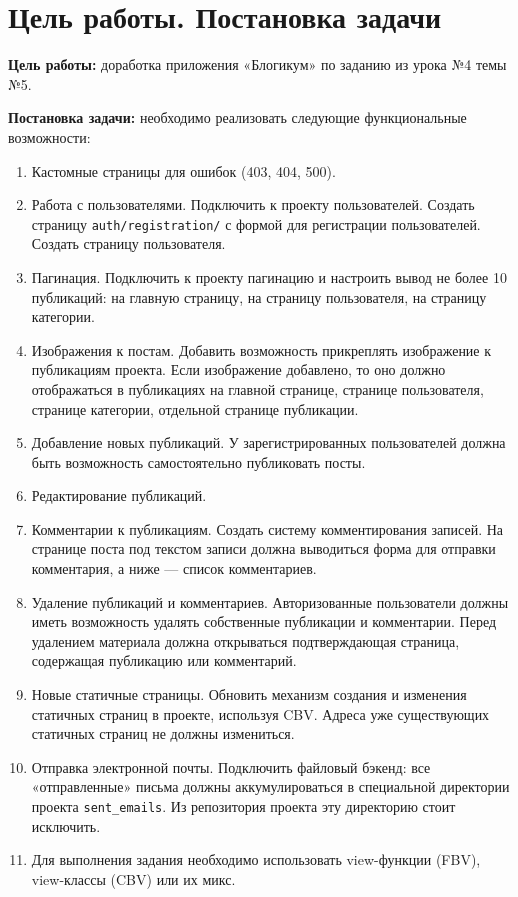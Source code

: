 \documentclass[bachelor, och, pract]{SCWorks}
\begin{document}
\section{Цель работы. Постановка задачи}

\textbf{Цель работы:} доработка приложения «Блогикум» по заданию из урока №4 темы №5.


\textbf{Постановка задачи:} необходимо реализовать следующие функциональные возможности:

\begin{enumerate}
    \item Кастомные страницы для ошибок (403, 404, 500).
    \item Работа с пользователями. Подключить к проекту пользователей. Создать страницу \texttt{auth/registration/} с формой для регистрации пользователей. Создать страницу пользователя.
    \item Пагинация. Подключить к проекту пагинацию и настроить вывод не более 10 публикаций: на главную страницу, на страницу пользователя, на страницу категории.
    \item Изображения к постам. Добавить возможность прикреплять изображение к публикациям проекта. Если изображение добавлено, то оно должно отображаться в публикациях на главной странице, странице пользователя, странице категории, отдельной странице публикации.
    \item Добавление новых публикаций. У зарегистрированных пользователей должна быть возможность самостоятельно публиковать посты.
    \item Редактирование публикаций.
    \item Комментарии к публикациям. Создать систему комментирования записей. На странице поста под текстом записи должна выводиться форма для отправки комментария, а ниже — список комментариев.
    \item Удаление публикаций и комментариев. Авторизованные пользователи должны иметь возможность удалять собственные публикации и комментарии. Перед удалением материала должна открываться подтверждающая страница, содержащая публикацию или комментарий.
    \item Новые статичные страницы. Обновить механизм создания и изменения статичных страниц в проекте, используя CBV. Адреса уже существующих статичных страниц не должны измениться.
    \item Отправка электронной почты. Подключить файловый бэкенд: все «отправленные» письма должны аккумулироваться в специальной директории проекта \texttt{sent\_emails}. Из репозитория проекта эту директорию стоит исключить.
    \item Для выполнения задания необходимо использовать view-функции (FBV), view-классы (CBV) или их микс.
\end{enumerate}
\end{document}

